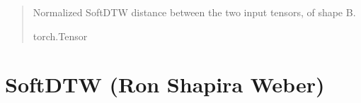 \documentclass[letterpaper,10pt,english]{sphinxmanual}
\begin{document}
\begin{fulllineitems}
\begin{fulllineitems}
\begin{quote}
\begin{description}
\begin{itemize}
\end{itemize}

\sphinxAtStartPar
{} \textendash{} Normalized SoftDTW distance between the two input tensors, of shape B.

\sphinxAtStartPar
torch.Tensor

\end{description}\end{quote}

\end{fulllineitems}


\end{fulllineitems}


\sphinxstepscope


\section{SoftDTW (Ron Shapira Weber)}
\label{\detokenize{dtw_loss_functions.soft_dtw_implementations.soft_dtw_cuda_ron:module-dtw_loss_functions.soft_dtw_implementations.soft_dtw_cuda_ron}}\label{\detokenize{dtw_loss_functions.soft_dtw_implementations.soft_dtw_cuda_ron:softdtw-ron-shapira-weber}}\label{\detokenize{dtw_loss_functions.soft_dtw_implementations.soft_dtw_cuda_ron::doc}}
\end{document}
